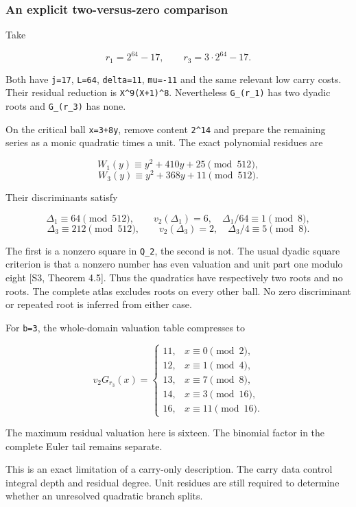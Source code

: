 \documentclass[11pt,letterpaper]{article}
\begin{document}
\subsubsection{An explicit two-versus-zero comparison}\label{an-explicit-two-versus-zero-comparison}

Take

\[
r_1=2^{64}-17,\qquad r_3=3\cdot2^{64}-17.
\]

Both have \texttt{j=17}, \texttt{L=64}, \texttt{delta=11}, \texttt{mu=-11} and the same relevant low carry costs. Their residual reduction is \texttt{X\^{}9(X+1)\^{}8}. Nevertheless \texttt{G\_(r\_1)} has two dyadic roots and \texttt{G\_(r\_3)} has none.

On the critical ball \texttt{x=3+8y}, remove content \texttt{2\^{}14} and prepare the remaining series as a monic quadratic times a unit. The exact polynomial residues are

\[
W_1(y)\equiv y^2+410y+25\pmod{512},
\] \[
W_3(y)\equiv y^2+368y+11\pmod{512}.
\]


Their discriminants satisfy

\[
\Delta_1\equiv64\pmod{512},\qquad
v_2(\Delta_1)=6,\quad \Delta_1/64\equiv1\pmod8,
\] \[
\Delta_3\equiv212\pmod{512},\qquad
v_2(\Delta_3)=2,\quad \Delta_3/4\equiv5\pmod8.
\]

The first is a nonzero square in \texttt{Q\_2}, the second is not. The usual dyadic square criterion is that a nonzero number has even valuation and unit part one modulo eight {[}S3, Theorem 4.5{]}. Thus the quadratics have respectively two roots and no roots. The complete atlas excludes roots on every other ball. No zero discriminant or repeated root is inferred from either case.

For \texttt{b=3}, the whole-domain valuation table compresses to

\[
v_2G_{r_3}(x)=
\begin{cases}
11,&x\equiv0\pmod2,\\
12,&x\equiv1\pmod4,\\
13,&x\equiv7\pmod8,\\
14,&x\equiv3\pmod{16},\\
16,&x\equiv11\pmod{16}.
\end{cases} \tag{VI.16}
\]

The maximum residual valuation here is sixteen. The binomial factor in the complete Euler tail remains separate.

This is an exact limitation of a carry-only description. The carry data control integral depth and residual degree. Unit residues are still required to determine whether an unresolved quadratic branch splits.
\end{document}
